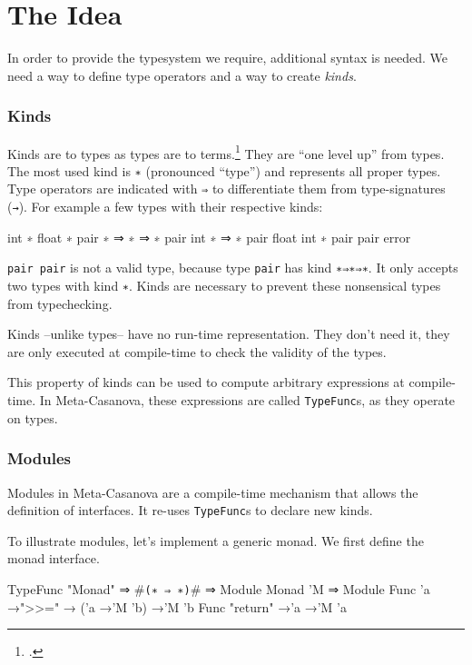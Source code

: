 \section{The Idea}
\begin{multicols}{2}\noindent
  In order to provide the typesystem we require, additional syntax is needed.
  We need a way to define type operators and a way to create \textit{kinds}.

  \subsubsection*{Kinds}
  Kinds are to types as types are to terms.\footcite[Chapter~30]{Pierce02}
  They are ``one level up'' from types.
  The most used kind is \texttt{∗} (pronounced ``type'') and represents all proper types.
  Type operators are indicated with \texttt{⇒} to differentiate them from type-signatures (\texttt{→}).
  For example a few types with their respective kinds:
  \begin{code}
  int             ∗
  float           ∗
  pair            ∗ ⇒ ∗ ⇒ ∗
  pair int        ∗ ⇒ ∗ 
  pair float int  ∗
  pair pair       error
  \end{code}

  \texttt{pair pair} is not a valid type, because type \texttt{pair} has kind \texttt{∗⇒∗⇒∗}.
  It only accepts two types with kind \texttt{∗}.
  Kinds are necessary to prevent these nonsensical types from typechecking.

  Kinds --unlike types-- have no run-time representation.
  They don't need it, they are only executed at compile-time to check the validity of the types.

  This property of kinds can be used to compute arbitrary expressions at compile-time.
  In Meta-Casanova, these expressions are called \texttt{TypeFunc}s, as they operate on types.

  \subsubsection*{Modules}
  Modules in Meta-Casanova are a compile-time mechanism that allows the definition of interfaces.
  It re-uses \texttt{TypeFunc}s to declare new kinds.

  To illustrate modules, let's implement a generic monad.
  We first define the monad interface.
  
  \begin{code}
  TypeFunc "Monad" ⇒ #\verb|(∗ ⇒ ∗)|# ⇒ Module
  Monad 'M ⇒ Module {
    Func 'a →">>=" → ('a →'M 'b) →'M 'b
    Func "return" →'a →'M 'a
  }
  \end{code}


\end{multicols}
